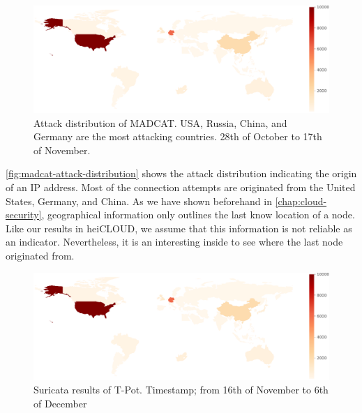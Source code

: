 \begin{figure}[ht]
    \centering
    \includegraphics[width=\textwidth]{figures/madcat-overview-map.pdf}
    \caption[Attack distribution of MADCAT]{Attack distribution of MADCAT. USA, Russia, China, and Germany are the most attacking countries. 28th of October to 17th of November.}
    \label{fig:madcat-attack-distribution}
\end{figure}

\autoref{fig:madcat-attack-distribution} shows the attack distribution indicating the origin of an IP address.
Most of the connection attempts are originated from the United States, Germany, and China.
As we have shown beforehand in \autoref{chap:cloud-security}, geographical information only outlines the last know location of a node.
Like our results in heiCLOUD, we assume that this information is not reliable as an indicator.
Nevertheless, it is an interesting inside to see where the last node originated from.

\begin{figure}[ht]
    \centering
    \includegraphics[width=\textwidth]{figures/madcat-overview-map.pdf}
    \caption[Suricata results of T-Pot]{Suricata results of T-Pot. Timestamp; from 16th of November to 6th of December}
    \label{fig:suricata-distribution}
\end{figure}

